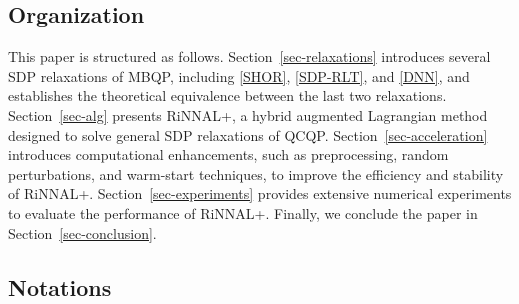 \documentclass[11pt]{article}
\theoremstyle{plain}
\begin{document}
\subsection{Organization}

This paper is structured as follows.
Section~\ref{sec-relaxations} introduces several SDP relaxations of MBQP, including \eqref{SHOR}, \eqref{SDP-RLT}, and \eqref{DNN}, and establishes the theoretical equivalence between the last two relaxations.
Section~\ref{sec-alg} presents RiNNAL+, a hybrid augmented Lagrangian method designed to solve general SDP relaxations of QCQP. 
Section~\ref{sec-acceleration} introduces computational enhancements, such as preprocessing, random perturbations, and warm-start techniques, to improve the efficiency and stability of RiNNAL+.
Section~\ref{sec-experiments} provides extensive numerical experiments to evaluate the performance of RiNNAL+.
Finally, we conclude the paper in Section~\ref{sec-conclusion}.



\subsection{Notations}\label{subsec-notations}
\end{document}
